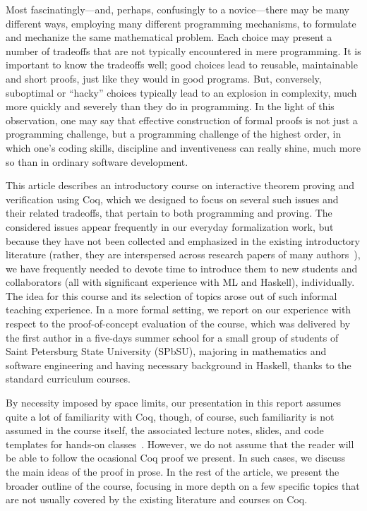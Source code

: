 \documentclass[blockstyle,preprint,nocopyrightspace]{sigplanconf}
\newcommand{\cf}{\textit{cf.}\xspace}
\begin{document}
Most fascinatingly---and, perhaps, confusingly to a novice---there may
be many different ways, employing many different programming
mechanisms, to formulate and mechanize the same mathematical
problem. Each choice may present a number of tradeoffs that are not
typically encountered in mere programming. It is important to know the
tradeoffs well; good choices lead to reusable, maintainable and short
proofs, just like they would in good programs. But, conversely,
suboptimal or ``hacky'' choices typically lead to an explosion in
complexity, much more quickly and severely than they do in
programming.
%
In the light of this observation, one may say that effective
construction of formal proofs is not just a programming challenge, but
a programming challenge of the highest order, in which one's coding
skills, discipline and inventiveness can really shine, much more so
than in ordinary software development.
%


This article describes an introductory course on interactive theorem
proving and verification using Coq, which we designed to focus on
several such issues and their related tradeoffs, that pertain to both
programming and proving. The considered issues appear frequently in
our everyday formalization work, but because they have not been
collected and emphasized in the existing introductory literature
(rather, they are interspersed across research papers of many
authors~\cite{Garillot:PhD,Mahboubi-Tassi:ITP13,Garillot-al:TPHOL09,Gonthier-al:JFP13,Gonthier-al:TR,Paulin-Mohring:TLCA93}),
we have frequently needed to devote time to introduce them to new
students and collaborators (all with significant experience with ML
and Haskell), individually. The idea for this course and its selection
of topics arose out of such informal teaching experience. In a more
formal setting, we report on our experience with respect to the
proof-of-concept evaluation of the course, which was delivered by the
first author in a five-days summer school for a small group of
students of Saint Petersburg State University (SPbSU), majoring in
mathematics and software engineering and having necessary background
in Haskell, thanks to the standard curriculum courses.

By necessity imposed by space limits, our presentation in this report
assumes quite a lot of familiarity with Coq, though, of course, such
familiarity is not assumed in the course itself, the associated
lecture notes, slides, and code templates for hands-on
classes~\cite{Sergey:PnP}. However, we do not assume that the reader
will be able to follow the ocasional Coq proof we present. In such
cases, we discuss the main ideas of the proof in prose. In the rest of
the article, we present the broader outline of the course, focusing in
more depth on a few specific topics that are not usually covered by
the existing literature and courses on Coq.
\end{document}
